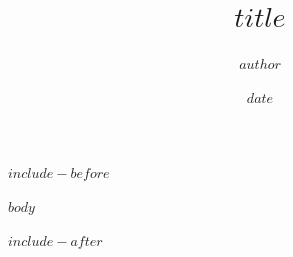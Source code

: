\documentclass[parskip=half,DIV=12,captions=tableabove,twoside=false,open=any]{scrreprt}
\author{$author$}
\title{$title$}
\date{$date$}
\begin{document}
$include-before$

$body$

$include-after$
\end{document}
